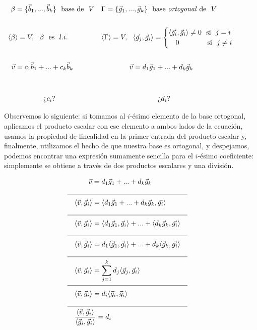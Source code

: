 \documentclass[12pt,dvipsnames]{article}
\numberwithin{equation}{section}
\begin{document}
\begin{align*}
    \beta&=\{\vec{b}_1,...,\vec{b}_k\} \ \ \text{base de} \ \ V& &\Gamma=\{\vec{g}_1,...,\vec{g}_k\} \ \ \text{base \emph{ortogonal} de} \ \ V& & &\\
    \\
    \langle\beta&\rangle = V, \ \ \beta \ \ \text{es} \ \ l.i.& &\langle\Gamma\rangle = V, \ \ \langle \vec{g}_j , \vec{g}_i \rangle = \begin{cases} \langle\vec{g_i}, \vec{g}_i\rangle\neq0 \ \ \text{si} \ \ j = i \\ \quad 0 \quad \ \ \ \ \ \ \ \ \ \text{si} \ \ j\neq i \end{cases}& & &\\
    \\
    \vec{v}&= c_1\vec{b}_1 + ... + c_k\vec{b}_k& &\quad \quad \quad \quad \vec{v}= d_1\vec{g}_1 + ... + d_k\vec{g}_k& & & \\
    \\
    \\
    &\quad \quad \quad \quad \text{¿}c_i\text{?}& & \quad \quad \quad \quad \quad \quad \quad \quad \text{¿}d_i\text{?} & & &
\end{align*}

Observemos lo siguiente: si tomamos al $i$-ésimo elemento de la base ortogonal, aplicamos el producto escalar con ese elemento a ambos lados de la ecuación, usamos la propiedad de linealidad en la primer entrada del producto escalar y, finalmente, utilizamos el hecho de que nuestra base es ortogonal, y despejamos, podemos encontrar una expresión sumamente sencilla para el $i$-ésimo coeficiente: simplemente se obtiene a través de dos productos escalares y una división.

\begin{align*}
    & & & \quad \quad \vec{v}= d_1\vec{g}_1 + ... + d_k\vec{g}_k& & & \\
    \cline{1-8}
    & & &\langle \vec{v} , \vec{g}_i \rangle = \langle d_1\vec{g}_1 + ... + d_k\vec{g}_k , \vec{g_i} \rangle& & & \\
    \cline{1-8}
    & & &\langle \vec{v} , \vec{g}_i \rangle = \langle d_1\vec{g}_1,\vec{g}_i\rangle + ... + \langle d_k\vec{g}_k , \vec{g_i} \rangle& & & \\
    \cline{1-8}
    & & &\langle \vec{v} , \vec{g}_i \rangle = d_1\langle \vec{g}_1, \vec{g}_i\rangle + ... + d_k\langle \vec{g}_k , \vec{g_i} \rangle& & & \\
    \cline{1-8}
    & & &\langle \vec{v} , \vec{g}_i \rangle = \sum_{j=1}^k d_j\langle \vec{g}_j, \vec{g}_i\rangle& & & \\
    \cline{1-8}
    & & &\langle \vec{v} , \vec{g}_i \rangle = d_i \langle\vec{g}_i, \vec{g}_i\rangle& & & \\
    \cline{1-8}
    & & &\frac{\langle \vec{v} ,\vec{g}_i \rangle}{\langle\vec{g}_i, \vec{g}_i\rangle} = d_i& & &
\end{align*}
\end{document}
